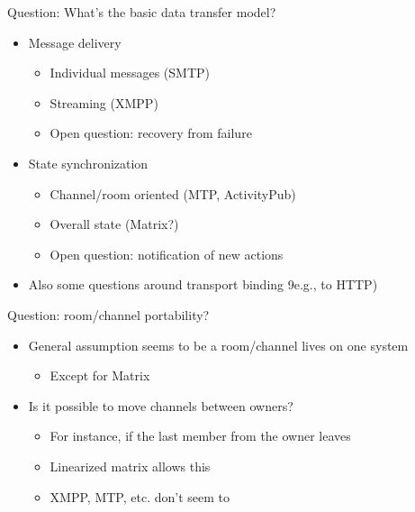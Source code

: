 \documentclass[helvetica]{beamer}
\begin{document}
\begin{frame}{Question: What's the basic data transfer model?}
  \begin{itemize}
  \item Message delivery
    \begin{itemize}
    \item Individual messages (SMTP)
    \item Streaming (XMPP)
    \item Open question: recovery from failure      
    \end{itemize}
  \item State synchronization
    \begin{itemize}
    \item Channel/room oriented (MTP, ActivityPub)
    \item Overall state (Matrix?)
    \item Open question: notification of new actions      
    \end{itemize}
  \item Also some questions around transport binding 9e.g., to HTTP)
  \end{itemize}
\end{frame}

\begin{frame}{Question: room/channel portability?}

  \begin{itemize}
  \item General assumption seems to be a room/channel lives on one system
    \begin{itemize}
    \item Except for Matrix      
    \end{itemize}
    
  \item Is it possible to move channels between owners?
    \begin{itemize}
    \item For instance, if the last member from the owner leaves
    \item Linearized matrix allows this
    \item XMPP, MTP, etc. don't seem to      
    \end{itemize}
  \end{itemize}
\end{frame}
\end{document}
